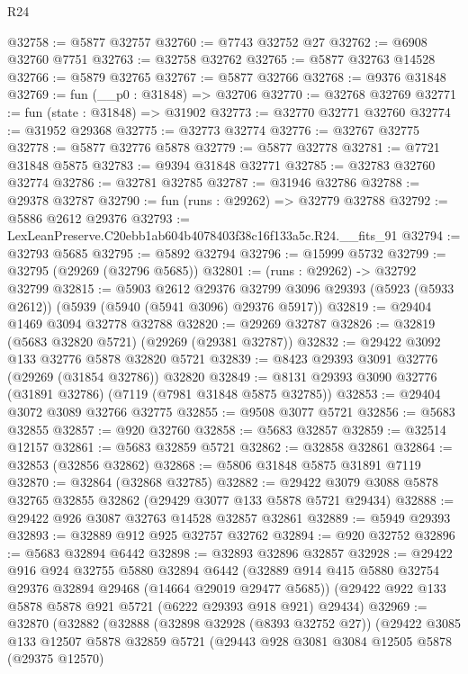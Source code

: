 \begin{lexlean}{R24}
\begin{coremodule}
@32758 := @5877 @32757
@32760 := @7743 @32752 @27
@32762 := @6908 @32760 @7751
@32763 := @32758 @32762
@32765 := @5877 @32763 @14528
@32766 := @5879 @32765
@32767 := @5877 @32766
@32768 := @9376 @31848
@32769 := fun (__p0 : @31848) => @32706
@32770 := @32768 @32769
@32771 := fun (state : @31848) => @31902
@32773 := @32770 @32771 @32760
@32774 := @31952 @29368
@32775 := @32773 @32774
@32776 := @32767 @32775
@32778 := @5877 @32776 @5878
@32779 := @5877 @32778
@32781 := @7721 @31848 @5875
@32783 := @9394 @31848 @32771
@32785 := @32783 @32760 @32774
@32786 := @32781 @32785
@32787 := @31946 @32786
@32788 := @29378 @32787
@32790 := fun (runs : @29262) => @32779 @32788
@32792 := @5886 @2612 @29376
@32793 := LexLeanPreserve.C20ebb1ab604b4078403f38c16f133a5c.R24.__fits_91
@32794 := @32793 @5685
@32795 := @5892 @32794
@32796 := @15999 @5732
@32799 := @32795 (@29269 (@32796 @5685))
@32801 := (runs : @29262) -> @32792 @32799
@32815 := @5903
    @2612
    @29376
    @32799
    @3096
    @29393
    (@5923 (@5933 @2612))
    (@5939 (@5940 (@5941 @3096) @29376 @5917))
@32819 := @29404 @1469 @3094 @32778 @32788
@32820 := @29269 @32787
@32826 := @32819 (@5683 @32820 @5721) (@29269 (@29381 @32787))
@32832 := @29422 @3092 @133 @32776 @5878 @32820 @5721
@32839 := @8423 @29393 @3091 @32776 (@29269 (@31854 @32786)) @32820
@32849 := @8131 @29393 @3090 @32776 (@31891 @32786) (@7119 (@7981 @31848 @5875 @32785))
@32853 := @29404 @3072 @3089 @32766 @32775
@32855 := @9508 @3077 @5721
@32856 := @5683 @32855
@32857 := @920 @32760
@32858 := @5683 @32857
@32859 := @32514 @12157
@32861 := @5683 @32859 @5721
@32862 := @32858 @32861
@32864 := @32853 (@32856 @32862)
@32868 := @5806 @31848 @5875 @31891 @7119
@32870 := @32864 (@32868 @32785)
@32882 := @29422 @3079 @3088 @5878 @32765 @32855 @32862 (@29429 @3077 @133 @5878 @5721 @29434)
@32888 := @29422 @926 @3087 @32763 @14528 @32857 @32861
@32889 := @5949 @29393
@32893 := @32889 @912 @925 @32757 @32762
@32894 := @920 @32752
@32896 := @5683 @32894 @6442
@32898 := @32893 @32896 @32857
@32928 := @29422
    @916
    @924
    @32755
    @5880
    @32894
    @6442
    (@32889 @914 @415 @5880 @32754 @29376 @32894 @29468 (@14664 @29019 @29477 @5685))
    (@29422 @922 @133 @5878 @5878 @921 @5721 (@6222 @29393 @918 @921) @29434)
@32969 := @32870
    (@32882
      (@32888
        (@32898 @32928 (@8393 @32752 @27))
        (@29422
          @3085
          @133
          @12507
          @5878
          @32859
          @5721
          (@29443
            @928
            @3081
            @3084
            @12505
            @5878
            (@29375 @12570)

\end{coremodule}
\end{lexlean}
